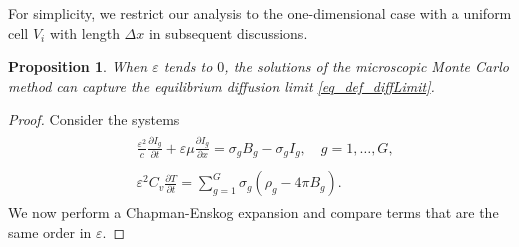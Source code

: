 \documentclass[preprint,12pt]{elsarticle}
\theoremstyle{definition}
\theoremstyle{plain}
\newtheorem{proposition}[theorem]{Proposition}
\numberwithin{equation}{section}
\numberwithin{algorithm}{section}
\newcounter{eq_count}
\newcounter{subeq_count}
\newcommand{\pdrv}[2]{\frac{\partial{#1}}{\partial{#2}}}
\begin{document}
For simplicity, we restrict our analysis to the one-dimensional case with a uniform cell $V_i$ with length $\Delta x$ in subsequent discussions.
\begin{proposition}
    When $\varepsilon$ tends to $0$, the solutions of the microscopic Monte Carlo method can capture the equilibrium diffusion limit \eqref{eq_def_diffLimit}.
\end{proposition}

\begin{proof}
Consider the systems
    \begin{subequations}
		\begin{align}\label{eq_asymptoticAnalysis3A}
            &\begin{aligned}
                \frac{\varepsilon^2}{c} \frac{\partial I_g}{\partial t}+\varepsilon\mu \pdrv{I_g}{x}  = \sigma_{g} B_g-\sigma_{g}I_g,  \quad g=1,\ldots,G, 
            \end{aligned}
            \\
		  &\begin{aligned}\label{eq_asymptoticAnalysis3B}
                \varepsilon^2 C_v \frac{\partial T}{\partial t}=\sum_{g=1}^{G} \sigma_{g} \left( \rho_g- 4 \pi B_g  \right) . 
            \end{aligned}
		\end{align}
   \end{subequations} 
  We now perform a Chapman-Enskog expansion and compare terms that are the same order in $\varepsilon$.
   
   


\end{proof}
\end{document}
